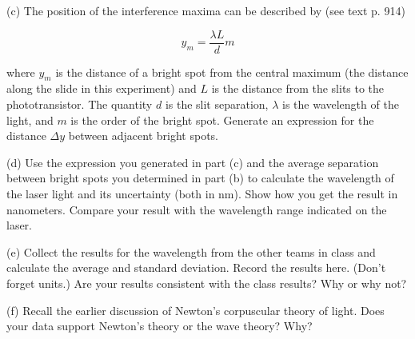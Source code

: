\newpage

(c) The position of the interference maxima can be described by (see text p. 
914)

\[
y_{m}=\frac{\lambda L}{d}m\]


where $y_{m}$ is the distance of a bright spot from the central
maximum (the distance along the slide in this experiment) and $L$ is
the distance from the slits to the phototransistor. The quantity $d$
is the slit separation, \( \lambda  \) is the wavelength of the light,
and $m$ is the order of the bright spot. Generate an expression for
the distance $\Delta y$ between adjacent bright spots.
\vspace{20mm}

(d) Use the expression you generated in part (c) and the average separation
between bright spots you determined in part (b) to calculate the wavelength of 
the laser light and its uncertainty (both in nm). Show how you get the result 
in nanometers. Compare your result with the wavelength range indicated on the 
laser.
\vspace{40mm}

(e) Collect the results for the wavelength from the other teams in class
and calculate the average and standard deviation. Record the results here. 
(Don't forget units.)
Are your results consistent with the class results? Why or why not?
\vspace{60mm}

(f) Recall the earlier discussion of Newton's corpuscular theory of
light. Does your data support Newton's theory or the wave theory?
Why?\vspace{15mm}

